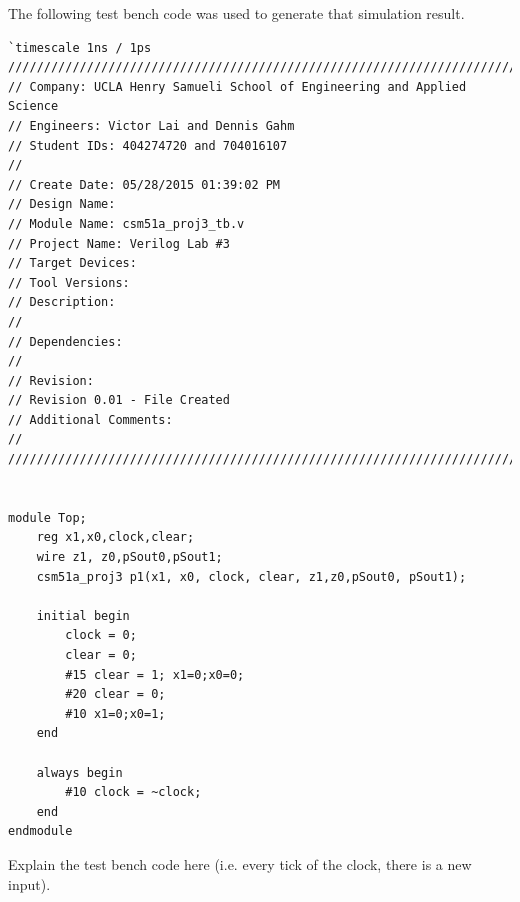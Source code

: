 \documentclass{article}
\begin{document}
The following test bench code was used to generate that simulation result.

\begin{verbatim}
`timescale 1ns / 1ps
/////////////////////////////////////////////////////////////////////////////
// Company: UCLA Henry Samueli School of Engineering and Applied Science
// Engineers: Victor Lai and Dennis Gahm
// Student IDs: 404274720 and 704016107
// 
// Create Date: 05/28/2015 01:39:02 PM
// Design Name: 
// Module Name: csm51a_proj3_tb.v
// Project Name: Verilog Lab #3
// Target Devices: 
// Tool Versions: 
// Description: 
// 
// Dependencies: 
// 
// Revision:
// Revision 0.01 - File Created
// Additional Comments:
// 
/////////////////////////////////////////////////////////////////////////////


module Top;
    reg x1,x0,clock,clear;
    wire z1, z0,pSout0,pSout1;
    csm51a_proj3 p1(x1, x0, clock, clear, z1,z0,pSout0, pSout1);
    
    initial begin
        clock = 0;
        clear = 0;
        #15 clear = 1; x1=0;x0=0;
        #20 clear = 0;
        #10 x1=0;x0=1;
    end
    
    always begin
        #10 clock = ~clock;
    end
endmodule

\end{verbatim}

Explain the test bench code here (i.e. every tick of the clock, there is a new 
input).

\end{document}
